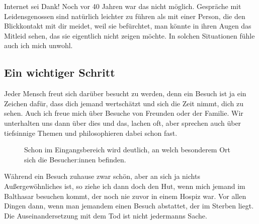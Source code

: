 \documentclass[fontsize=14pt,a4paper,headinclude,DIV=calc,automark]{scrbook}
\begin{document}
Internet sei Dank! Noch vor 40 Jahren war das nicht möglich. Gespräche mit Leidensgenossen sind natürlich leichter zu führen als mit einer Person, die den Blickkontakt mit dir meidet, weil sie befürchtet, man könnte in ihren Augen das Mitleid sehen, das sie eigentlich nicht zeigen möchte. In solchen Situationen fühle auch ich mich unwohl.

\subsection{Ein wichtiger Schritt}

Jeder Mensch freut sich darüber besucht zu werden, denn ein Besuch ist ja ein Zeichen dafür, dass dich jemand wertschätzt und sich die Zeit nimmt, dich zu sehen. Auch ich freue mich über Besuche von Freunden oder der Familie. Wir unterhalten uns dann über dies und das, lachen oft, aber sprechen auch über tiefsinnige Themen und philosophieren dabei schon fast.

\setlength{\fboxsep}{0pt}    %
\setlength{\fboxrule}{0.2pt} %
\begin{figure}[ht]
    \raggedright
    \caption{Schon im Eingangsbereich wird deutlich, an welch besonderem Ort sich die Besucher:innen befinden.}
    \label{fig:leben_lachen_sterben_trauern}
\end{figure}

Während ein Besuch zuhause zwar schön, aber an sich ja nichts Außergewöhnliches ist, so ziehe ich dann doch den Hut, wenn mich jemand im Balthasar besuchen kommt, der noch nie zuvor in einem Hospiz war. Vor allen Dingen dann, wenn man jemandem einen Besuch abstattet, der im Sterben liegt. Die Auseinandersetzung mit dem Tod ist nicht jedermanns Sache.
\end{document}
